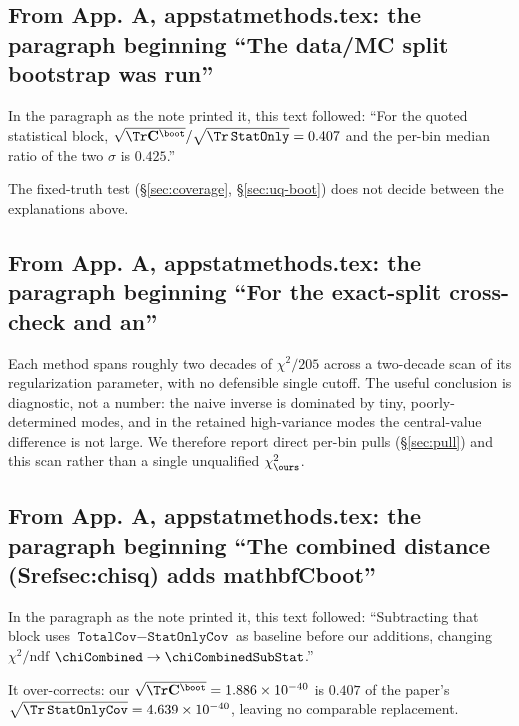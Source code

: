 \subsection{From App. A, appstatmethods.tex: the paragraph beginning ``The data/MC split bootstrap was run''}
In the paragraph as the note printed it, this text followed: ``For the quoted statistical block, $\sqrt{\Tr\mathbf{C}^{\boot}}/\sqrt{\Tr\,\texttt{StatOnly}}=0.407$ and the per-bin median ratio of the two $\sigma$ is $0.425$.''\par
The fixed-truth test (\S\ref{sec:coverage}, \S\ref{sec:uq-boot}) does not decide between the explanations above.

\subsection{From App. A, appstatmethods.tex: the paragraph beginning ``For the exact-split cross-check and an''}
Each method spans roughly two decades of $\chi^{2}/205$ across a two-decade scan of its regularization parameter, with no defensible single cutoff. The useful conclusion is diagnostic, not a number: the naive inverse is dominated by tiny, poorly-determined modes, and in the retained high-variance modes the central-value difference is not large. We therefore report direct per-bin pulls (\S\ref{sec:pull}) and this scan rather than a single unqualified $\chi^{2}_{\ours}$.

\subsection{From App. A, appstatmethods.tex: the paragraph beginning ``The combined distance (Srefsec:chisq) adds mathbfCboot''}
In the paragraph as the note printed it, this text followed: ``Subtracting that block uses $\texttt{TotalCov}-\texttt{StatOnlyCov}$ as baseline before our additions, changing $\chi^{2}/\mathrm{ndf}$ $\chiCombined\to \chiCombinedSubStat$.''\par
It over-corrects: our $\sqrt{\Tr\mathbf{C}^{\boot}}=1.886\times10^{-40}$ is $0.407$ of the paper's $\sqrt{\Tr\,\texttt{StatOnlyCov}}=4.639\times10^{-40}$, leaving no comparable replacement.

